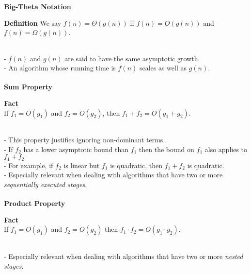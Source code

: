 \documentclass{article}
\begin{document}
~\\\\
\textbf{Big-Theta Notation}
\\
\begin{tcolorbox}
    \textbf{Definition}
    We say $f(n) = \Theta(g(n))$ if $f(n) = O(g(n))$ and $f(n) = \Omega(g(n))$.
\end{tcolorbox}
~\\
- $f(n)$ and $g(n)$ are said to have the same asymptotic growth. \\
- An algorithm whose running time is $f(n)$ scales as well as $g(n)$.
\\\\
\textbf{Sum Property}
\\
\begin{tcolorbox}
    \textbf{Fact} \\
    If $f_{1} = O(g_{1})$ and $f_{2} = O(g_{2})$, then $f_{1} + f_{2} = O(g_{1} + g_{2})$.
\end{tcolorbox}
~\\
- This property justifies ignoring non-dominant terms. \\
- If $f_{2}$ has a lower asymptotic bound than $f_{1}$ then the bound on $f_{1}$ also applies to $f_{1} + f_{2}$ \\
- For example, if $f_{2}$ is linear but $f_{1}$ is quadratic, then $f_{1} + f_{2}$ is quadratic. \\
- Especially relevant when dealing with algorithms that have two or more \emph{sequentially executed stages}.
\\\\
\textbf{Product Property}
\begin{tcolorbox}
    \textbf{Fact} \\
    If $f_{1} = O(g_{1})$ and $f_{2} = O(g_{2})$ then $f_{1} \cdot f_{2} = O(g_{1} \cdot g_{2})$.
\end{tcolorbox}
~\\
- Especially relevant when dealing with algorithms that have two or more \emph{nested stages.} \\
\end{document}
